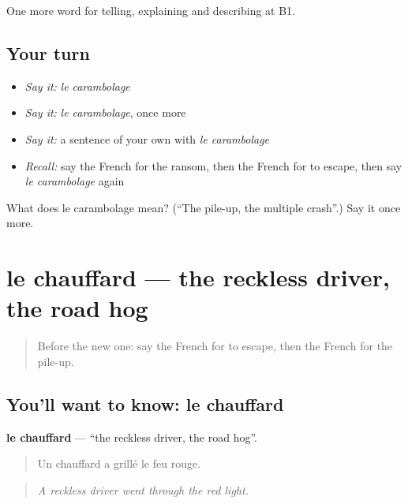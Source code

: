\begin{grammarlens}[title={What you've built}]
One more word for telling, explaining and describing at B1.
\end{grammarlens}

\subsection*{Your turn}
\begin{itemize}
\raggedright
  \item \emph{Say it:} \emph{le carambolage}
  \item \emph{Say it:} \emph{le carambolage}, once more
  \item \emph{Say it:} a sentence of your own with \emph{le carambolage}
  \item \emph{Recall:} say the French for the ransom, then the French for to escape, then say \emph{le carambolage} again
\end{itemize}

\begin{tcolorbox}[breakable,colback=teal!4,colframe=teal!35!black,title={Before you move on}]
What does le carambolage mean? (\textquotedblleft{}The pile-up, the multiple crash\textquotedblright{}.) Say it once more.
\end{tcolorbox}
\section[le chauffard]{le chauffard — the reckless driver, the road hog}

\label{lesson:FR-C297-chauffard}



\begin{quote}
Before the new one: say the French for to escape, then the French for the pile-up.
\end{quote}

\subsection*{You'll want to know: le chauffard}
\textbf{le chauffard} — \textquotedblleft{}the reckless driver, the road hog\textquotedblright{}.

\begin{quote}
Un chauffard a grillé le feu rouge.
\end{quote}

\begin{quote}
\emph{A reckless driver went through the red light.}
\end{quote}

